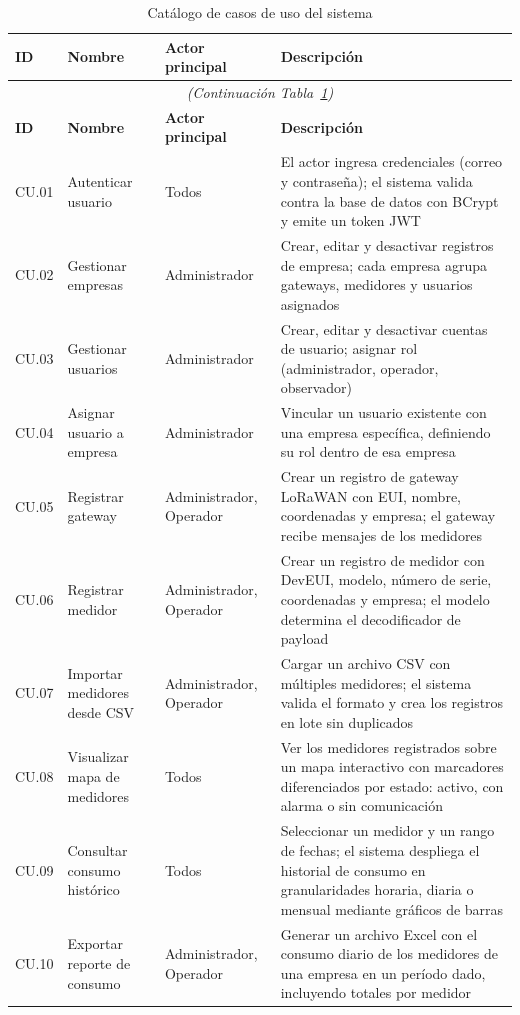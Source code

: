 \documentclass[12pt,a4paper,oneside]{report}
\begin{document}
\begin{longtable}{p{1.0cm}p{3.8cm}p{3.2cm}p{5.5cm}}
\caption{Catálogo de casos de uso del sistema}\label{tab:casosdeuso} \\
\toprule
\textbf{ID} & \textbf{Nombre} & \textbf{Actor principal} & \textbf{Descripción} \\
\midrule
\endfirsthead
\multicolumn{4}{c}{\textit{(Continuación Tabla~\ref{tab:casosdeuso})}} \\
\toprule
\textbf{ID} & \textbf{Nombre} & \textbf{Actor principal} & \textbf{Descripción} \\
\midrule
\endhead
\bottomrule
\endlastfoot
CU.01 & Autenticar usuario & Todos & El actor ingresa credenciales (correo y contraseña); el sistema valida contra la base de datos con BCrypt y emite un token JWT \\
CU.02 & Gestionar empresas & Administrador & Crear, editar y desactivar registros de empresa; cada empresa agrupa gateways, medidores y usuarios asignados \\
CU.03 & Gestionar usuarios & Administrador & Crear, editar y desactivar cuentas de usuario; asignar rol (administrador, operador, observador) \\
CU.04 & Asignar usuario a empresa & Administrador & Vincular un usuario existente con una empresa específica, definiendo su rol dentro de esa empresa \\
CU.05 & Registrar gateway & Administrador, Operador & Crear un registro de gateway LoRaWAN con EUI, nombre, coordenadas y empresa; el gateway recibe mensajes de los medidores \\
CU.06 & Registrar medidor & Administrador, Operador & Crear un registro de medidor con DevEUI, modelo, número de serie, coordenadas y empresa; el modelo determina el decodificador de payload \\
CU.07 & Importar medidores desde CSV & Administrador, Operador & Cargar un archivo CSV con múltiples medidores; el sistema valida el formato y crea los registros en lote sin duplicados \\
CU.08 & Visualizar mapa de medidores & Todos & Ver los medidores registrados sobre un mapa interactivo con marcadores diferenciados por estado: activo, con alarma o sin comunicación \\
CU.09 & Consultar consumo histórico & Todos & Seleccionar un medidor y un rango de fechas; el sistema despliega el historial de consumo en granularidades horaria, diaria o mensual mediante gráficos de barras \\
CU.10 & Exportar reporte de consumo & Administrador, Operador & Generar un archivo Excel con el consumo diario de los medidores de una empresa en un período dado, incluyendo totales por medidor \\

\end{longtable}
\end{document}
